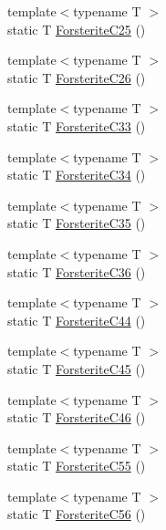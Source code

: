 \begin{DoxyCompactItemize}
\item 
{\footnotesize template$<$typename T $>$ }\\static T \mbox{\hyperlink{namespacempc_1_1data_ad518da0bea516b1c6125a8fb9afb436f}{Forsterite\+C25}} ()
\item 
{\footnotesize template$<$typename T $>$ }\\static T \mbox{\hyperlink{namespacempc_1_1data_a3c7eda5846e673cc90708a38b4658398}{Forsterite\+C26}} ()
\item 
{\footnotesize template$<$typename T $>$ }\\static T \mbox{\hyperlink{namespacempc_1_1data_af6c287f48fac7d4f5f5f3ea6e5bff3c1}{Forsterite\+C33}} ()
\item 
{\footnotesize template$<$typename T $>$ }\\static T \mbox{\hyperlink{namespacempc_1_1data_a0c2786dc35cbbdef320a85cf6ecfd22b}{Forsterite\+C34}} ()
\item 
{\footnotesize template$<$typename T $>$ }\\static T \mbox{\hyperlink{namespacempc_1_1data_a94d954891ed6bfae5879ee997a9cb4de}{Forsterite\+C35}} ()
\item 
{\footnotesize template$<$typename T $>$ }\\static T \mbox{\hyperlink{namespacempc_1_1data_a861e91de6e396c3694fd7b3020d7012e}{Forsterite\+C36}} ()
\item 
{\footnotesize template$<$typename T $>$ }\\static T \mbox{\hyperlink{namespacempc_1_1data_ad78a38d622c8221eb739fa0cd0aa252a}{Forsterite\+C44}} ()
\item 
{\footnotesize template$<$typename T $>$ }\\static T \mbox{\hyperlink{namespacempc_1_1data_aaa57264615454cacc2d61e61587d1403}{Forsterite\+C45}} ()
\item 
{\footnotesize template$<$typename T $>$ }\\static T \mbox{\hyperlink{namespacempc_1_1data_ad58c63bc7e5446b77d4002ede6917bd7}{Forsterite\+C46}} ()
\item 
{\footnotesize template$<$typename T $>$ }\\static T \mbox{\hyperlink{namespacempc_1_1data_a462d0d5086c7ba1936dfa26dc6bb5587}{Forsterite\+C55}} ()
\item 
{\footnotesize template$<$typename T $>$ }\\static T \mbox{\hyperlink{namespacempc_1_1data_a1ab84de7461416b2196f6daa52e52cce}{Forsterite\+C56}} ()
\item 

\end{DoxyCompactItemize}
